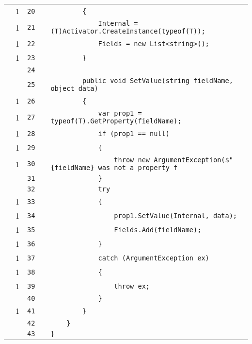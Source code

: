 \documentclass[a4paper,10pt]{article}
\begin{document}
\begin{longtable}[l]{lrrll}
\cellcolor{green} & 1 & \verb~20~ & & \verb~        {~\\
\cellcolor{green} & 1 & \verb~21~ & & \verb~            Internal = (T)Activator.CreateInstance(typeof(T));~\\
\cellcolor{green} & 1 & \verb~22~ & & \verb~            Fields = new List<string>();~\\
\cellcolor{green} & 1 & \verb~23~ & & \verb~        }~\\
\cellcolor{gray} &  & \verb~24~ & & \verb~~\\
\cellcolor{gray} &  & \verb~25~ & & \verb~        public void SetValue(string fieldName, object data)~\\
\cellcolor{green} & 1 & \verb~26~ & & \verb~        {~\\
\cellcolor{green} & 1 & \verb~27~ & & \verb~            var prop1 = typeof(T).GetProperty(fieldName);~\\
\cellcolor{green} & 1 & \verb~28~ & & \verb~            if (prop1 == null)~\\
\cellcolor{green} & 1 & \verb~29~ & & \verb~            {~\\
\cellcolor{green} & 1 & \verb~30~ & & \verb~                throw new ArgumentException($"{fieldName} was not a property f~\\
\cellcolor{gray} &  & \verb~31~ & & \verb~            }~\\
\cellcolor{gray} &  & \verb~32~ & & \verb~            try~\\
\cellcolor{green} & 1 & \verb~33~ & & \verb~            {~\\
\cellcolor{green} & 1 & \verb~34~ & & \verb~                prop1.SetValue(Internal, data);~\\
\cellcolor{green} & 1 & \verb~35~ & & \verb~                Fields.Add(fieldName);~\\
\cellcolor{green} & 1 & \verb~36~ & & \verb~            }~\\
\cellcolor{green} & 1 & \verb~37~ & & \verb~            catch (ArgumentException ex)~\\
\cellcolor{green} & 1 & \verb~38~ & & \verb~            {~\\
\cellcolor{green} & 1 & \verb~39~ & & \verb~                throw ex;~\\
\cellcolor{gray} &  & \verb~40~ & & \verb~            }~\\
\cellcolor{green} & 1 & \verb~41~ & & \verb~        }~\\
\cellcolor{gray} &  & \verb~42~ & & \verb~    }~\\
\cellcolor{gray} &  & \verb~43~ & & \verb~}~\\
\end{longtable}
\newpage
\end{document}
